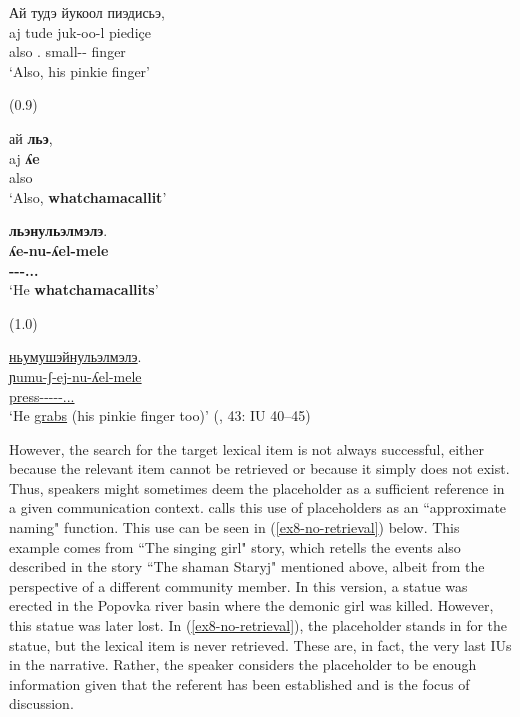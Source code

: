 \documentclass[output=paper,colorlinks,citecolor=brown
\ChapterDOI{10.5281/zenodo.15697581}
]{langscibook}
\begin{document}
\begin{exe}
\ex \label{ex7-partial-mirroring}
    \glll Ай тудэ йукоол пиэдисьэ, \\
    aj tude juk-oo-l piediçe \\
    also \Tsg.\Gen{} small-\Res-\Ptcp{} finger \\
    \glt `Also, his pinkie finger'

\sn (0.9)

\sn 
    \glll ай \textbf{льэ}, \\
    aj \textbf{ʎe} \\
    also \textbf{\Ph{}} \\
    \glt `Also, \textbf{whatchamacallit}'

\sn
    \glll \textbf{льэнульэлмэлэ}. \\
    \textbf{ʎe-nu-ʎel-mele} \\
    \textbf{\Ph-\Impf-\Ev-\Ass.\Tr.\Pf.\Tsg{}} \\
    \glt `He \textbf{whatchamacallits}'

\sn (1.0)

\sn 
    \glll \uline{ньумушэйнульэлмэлэ}. \\
    \uline{ɲumu-ʃ-ej-nu-ʎel-mele} \\
    \uline{press-\Caus-\Pfv-\Impf-\Ev-\Ass.\Tr.\Pf.\Tsg{}} \\
    \glt `He \uline{grabs} (his pinkie finger too)'  (\citealt{Nikolaeva_Mayer2004}, 43: IU 40--45)
\end{exe}


However, the search for the target lexical item is not always successful, either because the relevant item cannot be retrieved or because it simply does not exist.
Thus, speakers might sometimes deem the placeholder as a sufficient reference in a given communication context. 
\citet{Podlesskaya2010} calls this use of placeholders as an ``approximate naming" function. 
This use can be seen in (\ref{ex8-no-retrieval}) below.
This example comes from ``The singing girl" story, which retells the events also described in the story ``The shaman Staryj" mentioned above, albeit from the perspective of a different community member.
In this version, a statue was erected in the Popovka river basin where the demonic girl was killed. 
However, this statue was later lost. 
In (\ref{ex8-no-retrieval}), the placeholder stands in for the statue, but the lexical item is never retrieved. 
These are, in fact, the very last IUs in the narrative. 
Rather, the speaker considers the placeholder to be enough information given that the referent has been established and is the focus of discussion. 
\end{document}
